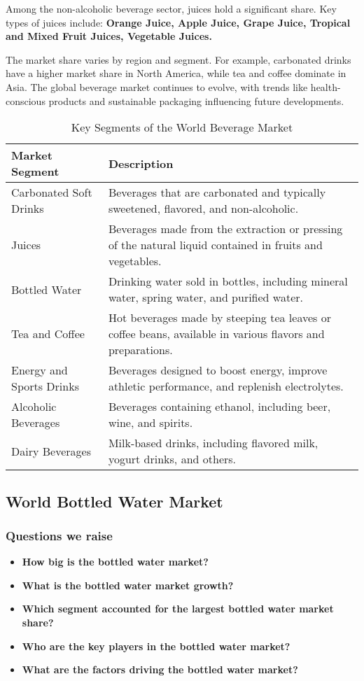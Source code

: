 \documentclass{article}
\begin{document}
Among the non-alcoholic beverage sector, juices hold a significant share. Key types of juices include:
\textbf{Orange Juice, Apple Juice, Grape Juice, Tropical and Mixed Fruit Juices, Vegetable Juices.}\par

The market share varies by region and segment. For example, carbonated drinks have a higher market share in North America, while tea and coffee dominate in Asia. The global beverage market continues to evolve, with trends like health-conscious products and sustainable packaging influencing future developments.
\begin{table}[h]
\centering
\begin{tabularx}{\textwidth}{|>{\centering\arraybackslash}X|>{\centering\arraybackslash}X|}
\hline
\textbf{Market Segment} & \textbf{Description} \\ \hline
Carbonated Soft Drinks & Beverages that are carbonated and typically sweetened, flavored, and non-alcoholic. \\ \hline
Juices & Beverages made from the extraction or pressing of the natural liquid contained in fruits and vegetables. \\ \hline
Bottled Water & Drinking water sold in bottles, including mineral water, spring water, and purified water. \\ \hline
Tea and Coffee & Hot beverages made by steeping tea leaves or coffee beans, available in various flavors and preparations. \\ \hline
Energy and Sports Drinks & Beverages designed to boost energy, improve athletic performance, and replenish electrolytes. \\ \hline
Alcoholic Beverages & Beverages containing ethanol, including beer, wine, and spirits. \\ \hline
Dairy Beverages & Milk-based drinks, including flavored milk, yogurt drinks, and others. \\ \hline
\end{tabularx}
\caption{Key Segments of the World Beverage Market}
\label{table:beverage_market_segments}
\end{table}

\subsection{World Bottled Water Market}
\subsubsection{Questions we raise}
\begin{itemize}
    \item \textbf{How big is the bottled water market?}
    \item \textbf{What is the bottled water market growth?}
    \item \textbf{Which segment accounted for the largest bottled water market share?}
    \item \textbf{Who are the key players in the bottled water market?}
    \item \textbf{What are the factors driving the bottled water market?}
\end{itemize}
\end{document}
